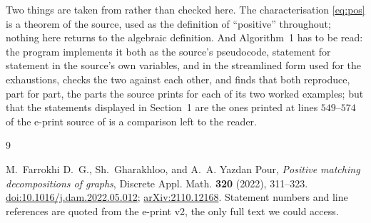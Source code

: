 \documentclass[11pt]{amsart}
\theoremstyle{remark}
\begin{document}
Two things are taken from \cite{FGY} rather than checked here. The
characterisation \eqref{eq:pos} is a theorem of the source, used as the
definition of ``positive'' throughout; nothing here returns to the algebraic
definition. And Algorithm~1 has to be read: the program implements it both as
the source's pseudocode, statement for statement in the source's own variables,
and in the streamlined form used for the exhaustions, checks the two against
each other, and finds that both reproduce, part for part, the parts the source
prints for each of its two worked examples; but that the statements displayed in
Section~1 are the ones printed at lines $549$--$574$ of the e-print source of
\cite{FGY} is a comparison left to the reader.

\begin{thebibliography}{9}

M.~Farrokhi D.~G., Sh.~Gharakhloo, and A.~A. Yazdan Pour,
\emph{Positive matching decompositions of graphs},
Discrete Appl. Math. \textbf{320} (2022), 311--323.
\href{https://doi.org/10.1016/j.dam.2022.05.012}{doi:10.1016/j.dam.2022.05.012};
\href{https://arxiv.org/abs/2110.12168}{arXiv:2110.12168}. Statement numbers
and line references are quoted from the e-print v2, the only full text we could
access.

\end{thebibliography}
\end{document}
